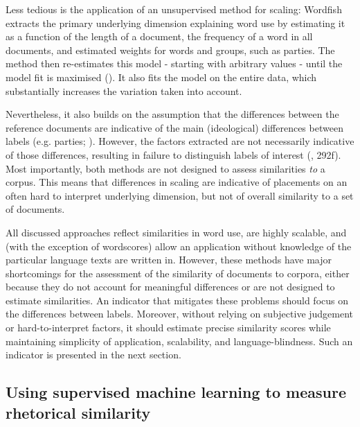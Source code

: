 \documentclass{article}
\begin{document}
Less tedious is the application of an unsupervised method for scaling: Wordfish extracts the primary underlying dimension explaining word use by estimating it as a function of the length of a document, the frequency of a word in all documents, and estimated weights for words and groups, such as parties. The method then re-estimates this model - starting with arbitrary values - until the model fit is maximised (\cite{Slapin2008}). It also fits the model on the entire data, which substantially increases the variation taken into account.\par

Nevertheless, it also builds on the assumption that the differences between the reference documents are indicative of the main (ideological) differences between labels (e.g. parties; \cite{Lowe2008}). However, the factors extracted are not necessarily indicative of those differences, resulting in failure to distinguish labels of interest (\cite{Grimmer2013TextASData}, 292f). Most importantly, both methods are not designed to assess similarities \textit{to} a corpus. This means that differences in scaling are indicative of placements on an often hard to interpret underlying dimension, but not of overall similarity to a set of documents.\par

All discussed approaches reflect similarities in word use, are highly scalable, and (with the exception of wordscores) allow an application without knowledge of the particular language texts are written in. However, these methods have major shortcomings for the assessment of the similarity of documents to corpora, either because they do not account for meaningful differences or are not designed to estimate similarities. An indicator that mitigates these problems should focus on the differences between labels. Moreover, without relying on subjective judgement or hard-to-interpret factors, it should estimate precise similarity scores while maintaining simplicity of application, scalability, and language-blindness. Such an indicator is presented in the next section.\par

\subsection{Using supervised machine learning to measure rhetorical similarity}
\label{sec:method}
\end{document}

